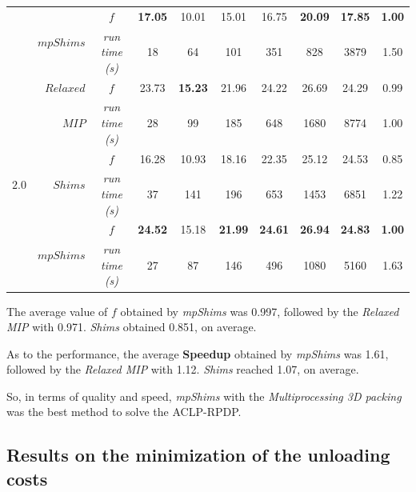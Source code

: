 \documentclass[preprint,authoryear]{elsarticle}
\begin{document}
\begin{table}[H]
\begin{tabular}{crcccccccc}
		\cmidrule{2-10}		                       
		&\multirow{2}{*}{ $mpShims$}      & $f$                &{\bf 17.05}&   10.01   &   15.01   &   16.75   &{\bf 20.09}&{\bf 17.85}&{\bf 1.00} \\%
		&                                 & {\it run time (s)} &    18     &    64     &     101   &    351    &   828     &  3879     &     1.50  \\%
		\toprule
		\multirow{7}{*}{$2.0$}&$Relaxed$  & $f$                &     23.73 &{\bf 15.23}&   21.96   &   24.22   &   26.69   &    24.29  &     0.99  \\%
		&                       $MIP$     & {\it run time (s)} &    28     &     99    &     185   &    648    &   1680    &   8774    &     1.00  \\%
		\cmidrule{2-10}		                       
		&\multirow{2}{*}{ $Shims$}        & $f$                &   16.28   &   10.93   &   18.16   &   22.35   &   25.12   &   24.53   &     0.85  \\%
		&                                 & {\it run time (s)} &    37     &    141    &   196     &     653   &   1453    &   6851    &     1.22  \\%
		\cmidrule{2-10}		                       
		&\multirow{2}{*}{ $mpShims$}      & $f$                &{\bf 24.52}&   15.18   &{\bf 21.99}&{\bf 24.61}&{\bf 26.94}&{\bf 24.83}&{\bf 1.00} \\%
		&                                 & {\it run time (s)} &    27     &    87     &   146     &    496    &   1080    &   5160    &     1.63  \\%
		\bottomrule	
	\end{tabular}
	\normalsize
\end{table}

The average value of $f$ obtained by {\it mpShims} was 0.997, followed by the {\it Relaxed MIP} with 0.971.  {\it Shims} obtained 0.851, on average.

As to the performance, the average {\bf Speedup} obtained by {\it mpShims} was 1.61, followed by the {\it Relaxed MIP} with 1.12. {\it Shims} reached 1.07, on average.

So, in terms of quality and speed, {\it mpShims} with the {\it Multiprocessing 3D packing} was the best method to solve the ACLP-RPDP.

\subsection{Results on the minimization of the unloading costs}
\label{improvement}
\end{document}
